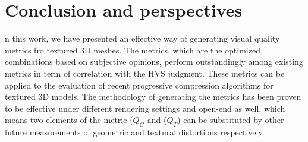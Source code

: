 \section{Conclusion and perspectives}
n this work, we have presented an effective way of generating visual quality metrics fro textured 3D meshes. The metrics, which are the optimized combinations based on subjective opinions, perform outstandingly among existing metrics in term of correlation with the HVS judgment.  These metrics can be applied to the evaluation of recent progressive compression algorithms for textured 3D models. The methodology of generating the metrics has been proven to be effective under different rendering settings and open-end as well, which means two elements of the metric ($Q_G$ and ($Q_T$) can be substituted by other future measurements of geometric and textural distortions respectively.  \\
